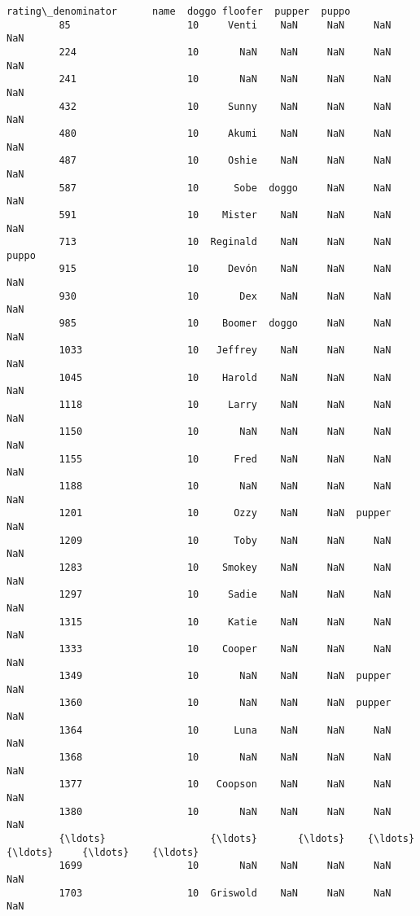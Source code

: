 \documentclass[11pt]{article}
\begin{document}
\begin{Verbatim}[commandchars=\\\{\}]
               rating\_denominator      name  doggo floofer  pupper  puppo  
         85                    10     Venti    NaN     NaN     NaN    NaN  
         224                   10       NaN    NaN     NaN     NaN    NaN  
         241                   10       NaN    NaN     NaN     NaN    NaN  
         432                   10     Sunny    NaN     NaN     NaN    NaN  
         480                   10     Akumi    NaN     NaN     NaN    NaN  
         487                   10     Oshie    NaN     NaN     NaN    NaN  
         587                   10      Sobe  doggo     NaN     NaN    NaN  
         591                   10    Mister    NaN     NaN     NaN    NaN  
         713                   10  Reginald    NaN     NaN     NaN  puppo  
         915                   10     Devón    NaN     NaN     NaN    NaN  
         930                   10       Dex    NaN     NaN     NaN    NaN  
         985                   10    Boomer  doggo     NaN     NaN    NaN  
         1033                  10   Jeffrey    NaN     NaN     NaN    NaN  
         1045                  10    Harold    NaN     NaN     NaN    NaN  
         1118                  10     Larry    NaN     NaN     NaN    NaN  
         1150                  10       NaN    NaN     NaN     NaN    NaN  
         1155                  10      Fred    NaN     NaN     NaN    NaN  
         1188                  10       NaN    NaN     NaN     NaN    NaN  
         1201                  10      Ozzy    NaN     NaN  pupper    NaN  
         1209                  10      Toby    NaN     NaN     NaN    NaN  
         1283                  10    Smokey    NaN     NaN     NaN    NaN  
         1297                  10     Sadie    NaN     NaN     NaN    NaN  
         1315                  10     Katie    NaN     NaN     NaN    NaN  
         1333                  10    Cooper    NaN     NaN     NaN    NaN  
         1349                  10       NaN    NaN     NaN  pupper    NaN  
         1360                  10       NaN    NaN     NaN  pupper    NaN  
         1364                  10      Luna    NaN     NaN     NaN    NaN  
         1368                  10       NaN    NaN     NaN     NaN    NaN  
         1377                  10   Coopson    NaN     NaN     NaN    NaN  
         1380                  10       NaN    NaN     NaN     NaN    NaN  
         {\ldots}                  {\ldots}       {\ldots}    {\ldots}     {\ldots}     {\ldots}    {\ldots}  
         1699                  10       NaN    NaN     NaN     NaN    NaN  
         1703                  10  Griswold    NaN     NaN     NaN    NaN  

\end{Verbatim}
\end{document}
